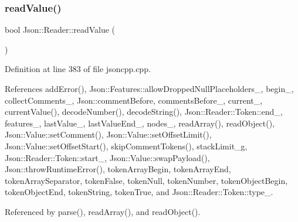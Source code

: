 \subsubsection{\texorpdfstring{read\+Value()}{readValue()}}
{\footnotesize\ttfamily bool Json\+::\+Reader\+::read\+Value (\begin{DoxyParamCaption}{ }\end{DoxyParamCaption})\hspace{0.3cm}{\ttfamily [private]}}



Definition at line 383 of file jsoncpp.\+cpp.



References add\+Error(), Json\+::\+Features\+::allow\+Dropped\+Null\+Placeholders\+\_\+, begin\+\_\+, collect\+Comments\+\_\+, Json\+::comment\+Before, comments\+Before\+\_\+, current\+\_\+, current\+Value(), decode\+Number(), decode\+String(), Json\+::\+Reader\+::\+Token\+::end\+\_\+, features\+\_\+, last\+Value\+\_\+, last\+Value\+End\+\_\+, nodes\+\_\+, read\+Array(), read\+Object(), Json\+::\+Value\+::set\+Comment(), Json\+::\+Value\+::set\+Offset\+Limit(), Json\+::\+Value\+::set\+Offset\+Start(), skip\+Comment\+Tokens(), stack\+Limit\+\_\+g, Json\+::\+Reader\+::\+Token\+::start\+\_\+, Json\+::\+Value\+::swap\+Payload(), Json\+::throw\+Runtime\+Error(), token\+Array\+Begin, token\+Array\+End, token\+Array\+Separator, token\+False, token\+Null, token\+Number, token\+Object\+Begin, token\+Object\+End, token\+String, token\+True, and Json\+::\+Reader\+::\+Token\+::type\+\_\+.



Referenced by parse(), read\+Array(), and read\+Object().


